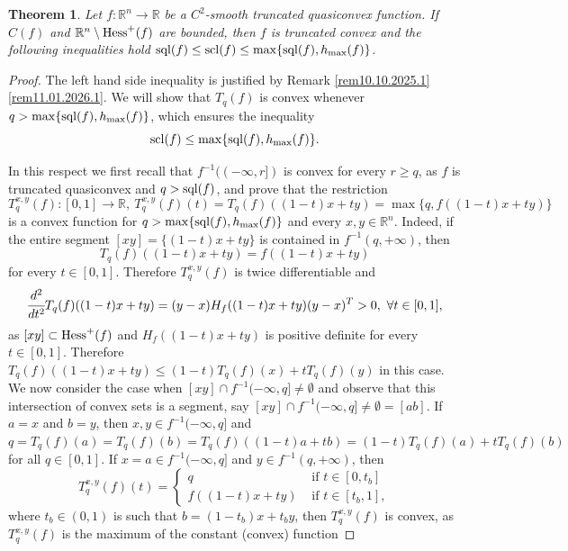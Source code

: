 \documentclass[12pt,twoside,reqno]{amsart}
\newtheorem{theorem}{Theorem}[section]
\theoremstyle{definition}
\numberwithin{equation}{section}
\begin{document}
\begin{theorem}\label{th17.01.2026.1}
Let $f:\mathbb{R}^n\longrightarrow\mathbb{R}$ be a $C^2$-smooth truncated quasiconvex function.
If $C(f)$ and $\mathbb{R}^n\setminus {\rm Hess}^+(f)$ are bounded, then $f$ is truncated convex and the following inequalities hold ${\rm sql}(f)\leq {\rm scl}(f)\leq \max\{{\rm sql}(f), h_{\max}(f)\}$.
\end{theorem}
\begin{proof}
The left hand side inequality is justified by Remark \ref{rem10.10.2025.1}\eqref{rem11.01.2026.1}.
We will show that $T_q(f)$ is convex whenever $q>\max\{{\rm sql}(f), h_{\max}(f)\}$, which ensures the inequality \[{\rm scl}(f)\leq \max\{{\rm sql}(f), h_{\max}(f)\}.\]

In this respect we first recall that $f^{-1}((-\infty,r])$ is convex for every $r\geq q$, as $f$ is truncated quasiconvex and $q>{\rm sql}(f)$, and prove that the restriction 
\[
T_q^{x,y}(f):[0,1]\longrightarrow\mathbb{R}, \ T_q^{x,y}(f)(t)=T_q(f)((1-t)x+ty)=\max\{q,f((1-t)x+ty)\}
\]
is a convex function for $q>\max\{{\rm sql}(f), h_{\max}(f)\}$ and every $x,y\in\mathbb{R}^n$. Indeed, if the entire segment $[xy]=\{(1-t)x+ty\}$ is contained in $f^{-1}(q,+\infty)$,
then \[T_q(f)((1-t)x+ty)=f((1-t)x+ty)\] for every $t\in[0,1]$. Therefore $T_q^{x,y}(f)$ is twice differentiable and
\[
 \cfrac{d^2}{dt^2}T_q(f)((1-t)x+ty)=(y-x)H_f((1-t)x+ty)(y-x)^T>0, \ \forall t\in[0,1],
\]
as $[xy]\subset {\rm Hess}^+(f)$ and $H_f((1-t)x+ty)$ is positive definite for every $t\in[0,1]$. Therefore $T_q(f)((1-t)x+ty)\leq (1-t)T_q(f)(x)+tT_q(f)(y)$ in this case.
We now consider
the case when $[xy]\cap f^{-1}(-\infty,q]\neq\emptyset$ and observe that this intersection of convex sets is a segment, 
say $[xy]\cap f^{-1}(-\infty,q]\neq\emptyset=[ab]$. If $a=x$ and $b=y$, then $x,y\in f^{-1}(-\infty,q]$ and 
$q=T_q(f)(a)=T_q(f)(b)=T_q(f)((1-t)a+tb)=(1-t)T_q(f)(a)+tT_q(f)(b)$ for all $q\in [0,1]$. 
If $x=a\in f^{-1}(-\infty,q]$ and $y\in f^{-1}(q,+\infty)$, then 
\[
T_q^{x,y}(f)(t)=\left\{
\begin{array}{cll}
q & \mbox{ if }t\in[0,t_b]\\
f((1-t)x+ty)& \mbox{ if }t\in[t_b,1],
\end{array}
\right.
\]
where $t_b\in(0,1)$ is such that $b=(1-t_b)x+t_by$, then $T_q^{x,y}(f)$ is convex, as $T_q^{x,y}(f)$ is the maximum of the constant (convex) function 

\end{proof}
\end{document}
